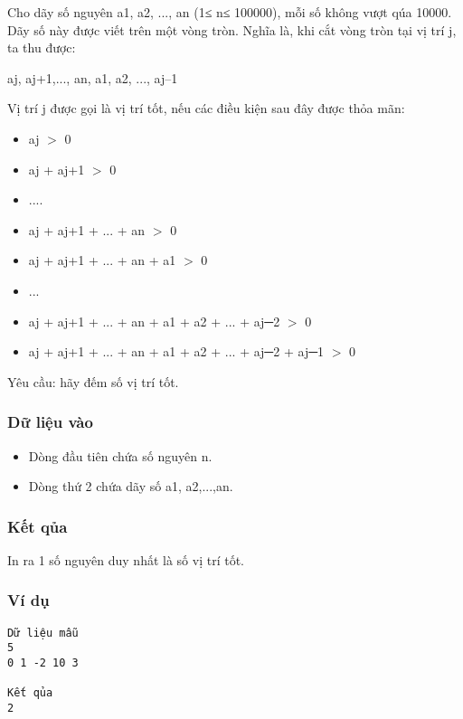 



   Cho dãy số nguyên a1, a2, ..., an (1≤ n≤ 100000), mỗi số không vượt qúa 10000. Dãy số này được viết trên một vòng tròn. Nghĩa là, khi cắt vòng   tròn tại vị trí j, ta thu được:  

   aj, aj+1,..., an, a1, a2, ..., aj–1  

   Vị trí j được gọi là vị trí tốt, nếu các điều kiện sau đây được thỏa mãn:  
\begin{itemize}
	\item     aj $>$ 0   
	\item     aj + aj+1 $>$ 0   
	\item     ....   
	\item     aj + aj+1 + ... + an $>$ 0   
	\item     aj + aj+1 + ... + an + a1 $>$ 0   
	\item     ...   
	\item     aj + aj+1 + ... + an + a1 + a2 + ... + aj─2 $>$ 0   
	\item     aj + aj+1 + ... + an + a1 + a2 + ... + aj─2 + aj─1 $>$ 0   
\end{itemize}

   Yêu cầu: hãy đếm số vị trí tốt.  

\subsubsection{   Dữ liệu vào  }
\begin{itemize}
	\item     Dòng đầu tiên chứa số nguyên n.   
	\item     Dòng thứ 2 chứa dãy số a1, a2,...,an.   
\end{itemize}

\subsubsection{   Kết qủa  }

   In ra 1 số nguyên duy nhất là số vị trí tốt.  

\subsubsection{   Ví dụ  }
\begin{verbatim}
Dữ liệu mẫu
5
0 1 -2 10 3

Kết qủa
2
\end{verbatim}